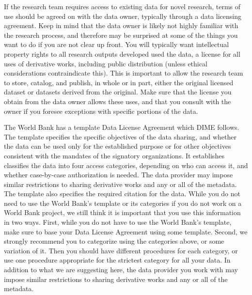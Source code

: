If the research team requires access to existing data for novel research,
terms of use should be agreed on with the data owner,
typically through a data licensing agreement.
Keep in mind that the data owner is likely not highly familiar
with the research process, and therefore may be surprised
at some of the things you want to do if you are not clear up front.
You will typically want intellectual property rights to all research outputs developed used the data,
a license for all uses of derivative works, including public distribution
(unless ethical considerations contraindicate this).
This is important to allow the research team to store, catalog, and publish, in whole or in part,
either the original licensed dataset or datasets derived from the original.
Make sure that the license you obtain from the data owner allows these uses,
and that you consult with the owner
if you foresee exceptions with specific portions of the data.

The World Bank has a template Data License Agreement which DIME follows.
The template specifies the specific objectives of the data sharing,
and whether the data can be used only for the established purpose or for other objectives
consistent with the mandates of the signatory organizations.
It establishes classifies the data into four access categories, depending on who can access it, and whether case-by-case authorization is needed.
The data provider may impose similar restrictions to sharing derivative works and any or all of the metadata.
The template also specifies the required citation for the data.
While you do not need to use the World Bank's template or its categories if you do not work on a World Bank project,
we still think it is important that you use this information in two ways.
First, while you do not have to use the World Bank's template,
make sure to base your Data License Agreement using some template.
Second, we strongly recommend you to categorize using the categories above,
or some variation of it.
Then you should have different procedures for each category,
or use one procedure appropriate for the strictest category for all your data.
In addition to what we are suggesting here,
the data provider you work with may impose similar restrictions to sharing derivative works
and any or all of the metadata.

